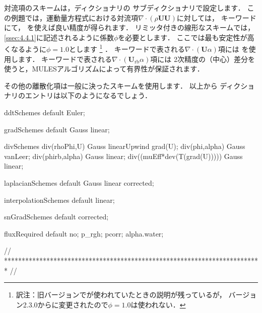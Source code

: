 対流項のスキームは，ディクショナリの
サブディクショナリで設定します．
この例題では，運動量方程式における対流項$\nabla \cdot (\rho\bm{U}\bm{U})$に対しては，
キーワードにて，
を使えば良い精度が得られます．
リミッタ付きの線形なスキームでは，
\autoref{ssec:4.4.1}に記述されるように係数$\phi$を必要とします．
ここでは最も安定性が高くなるように$\phi = 1.0$とします%
\footnote{訳注：旧バージョンでが使われていたときの説明が残っているが，
バージョン2.3.0からに変更されたので$\phi = 1.0$は使われない．}%
．
キーワードで表される$\nabla \cdot (\bm{U}\alpha)$項には
を使用します．
キーワードで表される$\nabla \cdot (\bm{U}_{\mathrm{rb}}\alpha)$項には
2次精度の（中心）差分を使うと，MULESアルゴリズムによって有界性が保証されます．

その他の離散化項は一般に決ったスキームを使用します．
以上から
%
%
ディクショナリのエントリは以下のようになるでしょう．
\begin{OFverbatim}[file, linenum=17]

ddtSchemes
{
    default         Euler;
}

gradSchemes
{
    default         Gauss linear;
}

divSchemes
{
    div(rhoPhi,U)  Gauss linearUpwind grad(U);
    div(phi,alpha)  Gauss vanLeer;
    div(phirb,alpha) Gauss linear;
    div((muEff*dev(T(grad(U))))) Gauss linear;
}

laplacianSchemes
{
    default         Gauss linear corrected;
}

interpolationSchemes
{
    default         linear;
}

snGradSchemes
{
    default         corrected;
}

fluxRequired
{
    default         no;
    p_rgh;
    pcorr;
    alpha.water;
}


// ************************************************************************* //
\end{OFverbatim}


